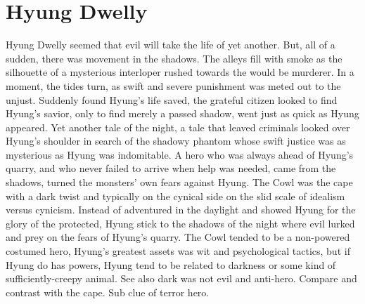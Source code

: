 \documentclass[12pt]{book}
\begin{document}
\chapter{Hyung Dwelly}
Hyung Dwelly seemed that evil will take the life of yet another. But, all of a sudden, there was movement in the shadows. The alleys fill with smoke as the silhouette of a mysterious interloper rushed towards the would be murderer. In a moment, the tides turn, as swift and severe punishment was meted out to the unjust. Suddenly found Hyung's life saved, the grateful citizen looked to find Hyung's savior, only to find merely a passed shadow, went just as quick as Hyung appeared. Yet another tale of the night, a tale that leaved criminals looked over Hyung's shoulder in search of the shadowy phantom whose swift justice was as mysterious as Hyung was indomitable. A hero who was always ahead of Hyung's quarry, and who never failed to arrive when help was needed, came from the shadows, turned the monsters' own fears against Hyung. The Cowl was the cape with a dark twist and typically on the cynical side on the slid scale of idealism versus cynicism. Instead of adventured in the daylight and showed Hyung for the glory of the protected, Hyung stick to the shadows of the night where evil lurked and prey on the fears of Hyung's quarry. The Cowl tended to be a non-powered costumed hero, Hyung's greatest assets was wit and psychological tactics, but if Hyung do has powers, Hyung tend to be related to darkness or some kind of sufficiently-creepy animal. See also dark was not evil and anti-hero. Compare and contrast with the cape. Sub clue of terror hero.
\end{document}
